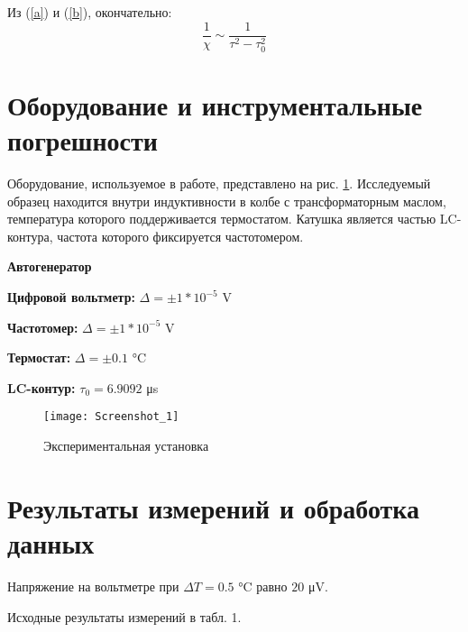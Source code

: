 \documentclass[a4paper]{article}
\newcommand{\rref}[1]{(\ref{#1})}
\newcommand{\Equip}[3]{{\bf #1:} $\Delta = \pm #2$ \si{#3}

}
\newcommand{\equip}[1]{{\bf #1}

}
\begin{document}
Из \rref{a} и \rref{b}, окончательно: 
\begin{equation}
	\frac{1}{\chi}\sim \frac{1}{\tau^2 - \tau^2_0}
\end{equation}
\section{Оборудование и инструментальные погрешности}

Оборудование, используемое в работе, представлено на рис. \ref{fig:set}. Исследуемый образец находится внутри индуктивности в колбе с трансформаторным маслом, температура которого поддерживается термостатом. Катушка является частью LC-контура, частота которого фиксируется частотомером.

\equip{Автогенератор }
\Equip{Цифровой вольтметр}{1*10^{-5}}{\volt}
\Equip{Частотомер}{1*10^{-5}}{\volt}
\Equip{Термостат}{0.1}{\degreeCelsius}
{\bf LC-контур: }$\tau_0 = 6.9092 $ \si{\micro \second}

\begin{figure}
	\centering
	\texttt{[image: Screenshot\_1]}
	\caption{Экспериментальная установка}
	\label{fig:set}
\end{figure}

\section{Результаты измерений и обработка данных}

Напряжение на вольтметре при $\Delta T
= 0.5$ \si{\degreeCelsius} равно $20$ \si{\micro \volt}.

Исходные результаты измерений в табл. 1.
\end{document}
